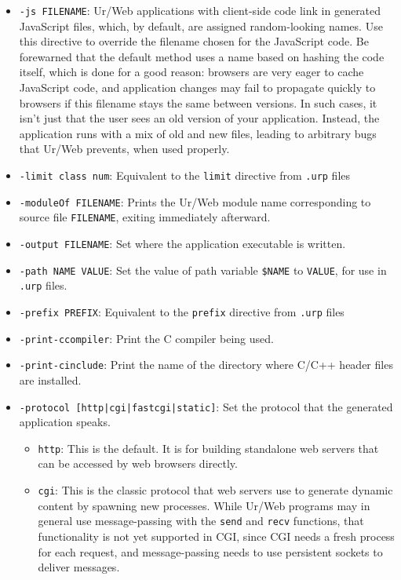 \documentclass{article}
\begin{document}
\begin{itemize}
\item \texttt{-js FILENAME}: Ur/Web applications with client-side code link in generated JavaScript files, which, by default, are assigned random-looking names.  Use this directive to override the filename chosen for the JavaScript code.  Be forewarned that the default method uses a name based on hashing the code itself, which is done for a good reason: browsers are very eager to cache JavaScript code, and application changes may fail to propagate quickly to browsers if this filename stays the same between versions.  In such cases, it isn't just that the user sees an old version of your application.  Instead, the application runs with a mix of old and new files, leading to arbitrary bugs that Ur/Web prevents, when used properly.

\item \texttt{-limit class num}: Equivalent to the \texttt{limit} directive from \texttt{.urp} files

\item \texttt{-moduleOf FILENAME}: Prints the Ur/Web module name corresponding to source file \texttt{FILENAME}, exiting immediately afterward.

\item \texttt{-output FILENAME}: Set where the application executable is written.

\item \texttt{-path NAME VALUE}: Set the value of path variable \texttt{\$NAME} to \texttt{VALUE}, for use in \texttt{.urp} files.

\item \texttt{-prefix PREFIX}: Equivalent to the \texttt{prefix} directive from \texttt{.urp} files

\item \texttt{-print-ccompiler}: Print the C compiler being used.

\item \texttt{-print-cinclude}: Print the name of the directory where C/C++ header files are installed.

\item \texttt{-protocol [http|cgi|fastcgi|static]}: Set the protocol that the generated application speaks.
  \begin{itemize}
  \item \texttt{http}: This is the default.  It is for building standalone web servers that can be accessed by web browsers directly.

  \item \texttt{cgi}: This is the classic protocol that web servers use to generate dynamic content by spawning new processes.  While Ur/Web programs may in general use message-passing with the \texttt{send} and \texttt{recv} functions, that functionality is not yet supported in CGI, since CGI needs a fresh process for each request, and message-passing needs to use persistent sockets to deliver messages.


\end{itemize}
\end{itemize}
\end{document}
